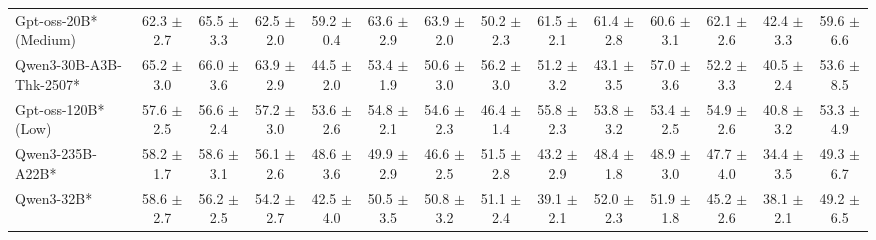 \documentclass{llmxive}
\begin{document}
\begin{table}[hbt]
{\begin{tabular}{l *{13}{c}}

Gpt-oss-20B* (Medium)	&
62.3 {\tiny$\pm$ 2.7}&
65.5 {\tiny$\pm$ 3.3}&
62.5 {\tiny$\pm$ 2.0}&
59.2 {\tiny$\pm$ 0.4}&
63.6 {\tiny$\pm$ 2.9}&
63.9 {\tiny$\pm$ 2.0}&
50.2 {\tiny$\pm$ 2.3}&
61.5 {\tiny$\pm$ 2.1}&
61.4 {\tiny$\pm$ 2.8}&
60.6 {\tiny$\pm$ 3.1}&
62.1 {\tiny$\pm$ 2.6}&
42.4 {\tiny$\pm$ 3.3}&
59.6 {\tiny$\pm$ 6.6} \\		

\rowcolor{gray!10}
Qwen3-30B-A3B-Thk-2507* &
65.2 {\tiny$\pm$ 3.0} &
66.0 {\tiny$\pm$ 3.6} &
63.9 {\tiny$\pm$ 2.9} &
44.5 {\tiny$\pm$ 2.0} &
53.4 {\tiny$\pm$ 1.9} &
50.6 {\tiny$\pm$ 3.0} &
56.2 {\tiny$\pm$ 3.0} &
51.2 {\tiny$\pm$ 3.2} &
43.1 {\tiny$\pm$ 3.5} &
57.0 {\tiny$\pm$ 3.6} &
52.2 {\tiny$\pm$ 3.3} &
40.5 {\tiny$\pm$ 2.4} &
53.6 {\tiny$\pm$ 8.5} \\
 


Gpt-oss-120B* (Low)	&
57.6 {\tiny$\pm$ 2.5}&
56.6 {\tiny$\pm$ 2.4}&
57.2 {\tiny$\pm$ 3.0}&
53.6 {\tiny$\pm$ 2.6}&
54.8 {\tiny$\pm$ 2.1}&
54.6 {\tiny$\pm$ 2.3}&
46.4 {\tiny$\pm$ 1.4}&
55.8 {\tiny$\pm$ 2.3}&
53.8 {\tiny$\pm$ 3.2}&
53.4 {\tiny$\pm$ 2.5}&
54.9 {\tiny$\pm$ 2.6}&
40.8 {\tiny$\pm$ 3.2}&
53.3 {\tiny$\pm$ 4.9}	
\\
\rowcolor{gray!10}
Qwen3-235B-A22B* &
58.2 {\tiny$\pm$ 1.7} &
58.6 {\tiny$\pm$ 3.1} &
56.1 {\tiny$\pm$ 2.6} &
48.6 {\tiny$\pm$ 3.6} &
49.9 {\tiny$\pm$ 2.9} &
46.6 {\tiny$\pm$ 2.5} &
51.5 {\tiny$\pm$ 2.8} &
43.2 {\tiny$\pm$ 2.9} &
48.4 {\tiny$\pm$ 1.8} &
48.9 {\tiny$\pm$ 3.0} &
47.7 {\tiny$\pm$ 4.0} &
34.4 {\tiny$\pm$ 3.5} &
49.3 {\tiny$\pm$ 6.7} \\

Qwen3-32B* &
58.6 {\tiny$\pm$ 2.7} &
56.2 {\tiny$\pm$ 2.5} &
54.2 {\tiny$\pm$ 2.7} &
42.5 {\tiny$\pm$ 4.0} &
50.5 {\tiny$\pm$ 3.5} &
50.8 {\tiny$\pm$ 3.2} &
51.1 {\tiny$\pm$ 2.4} &
39.1 {\tiny$\pm$ 2.1} &
52.0 {\tiny$\pm$ 2.3} &
51.9 {\tiny$\pm$ 1.8} &
45.2 {\tiny$\pm$ 2.6} &
38.1 {\tiny$\pm$ 2.1} &
49.2 {\tiny$\pm$ 6.5} \\



\end{tabular}}
\end{table}
\end{document}
